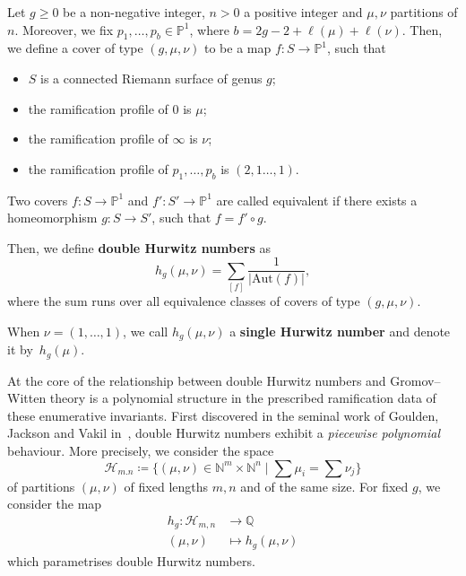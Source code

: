 \begin{defi}\label{def-hur}
Let $g\ge0$ be a non-negative integer, $n>0$ a positive integer and $\mu,\nu$ partitions of $n$. Moreover, we fix $p_1,\dots,p_b\in\mathbb{P}^1$, where $b=2g-2+\ell(\mu)+\ell(\nu)$. Then, we define a cover of type $(g,\mu,\nu)$ to be a map $f\colon S\to\mathbb{P}^1$, such that
\begin{itemize}
    \item $S$ is a connected Riemann surface of genus $g$;
    \item the ramification profile of $0$ is $\mu$;
    \item the ramification profile of $\infty$ is $\nu$;
    \item the ramification profile of $p_1,\dots,p_b$ is $(2,1\dots,1)$.
\end{itemize}
Two covers $f\colon S\to\mathbb{P}^1$ and $f'\colon S'\to\mathbb{P}^1$ are called equivalent if there exists a homeomorphism $g\colon S\to S'$, such that $f= f'\circ g$.

Then, we define \textbf{double Hurwitz numbers} as
\begin{equation*}
    h_g(\mu,\nu)=\sum_{[f]}\frac{1}{|\mathrm{Aut}(f)|},
\end{equation*}
where the sum runs over all equivalence classes of covers of type $(g,\mu,\nu)$.

When $\nu=(1,\dots,1)$, we call $h_g(\mu,\nu)$ a \textbf{single Hurwitz number} and denote it by~$h_g(\mu)$.
\end{defi}

At the core of the relationship between double Hurwitz numbers and Gromov--Witten theory is a polynomial structure in the prescribed ramification data of these enumerative invariants. First discovered in the seminal work of Goulden, Jackson and Vakil in~\cite{GJV05}, double Hurwitz numbers exhibit a \textit{piecewise polynomial} behaviour. More precisely, we consider the space \begin{equation*}
    \mathcal{H}_{m.n}\coloneqq\{(\mu,\nu)\in\mathbb{N}^m\times\mathbb{N}^n\mid \sum \mu_i=\sum \nu_j\}
\end{equation*}
of partitions $(\mu,\nu)$ of fixed lengths $m,n$ and of the same size. For fixed $g$, we consider the map
\begin{align*}
    h_g\colon \mathcal{H}_{m,n}&\to\mathbb{Q}\\
    (\mu,\nu)&\mapsto h_g(\mu,\nu)
\end{align*}
which parametrises double Hurwitz numbers.

